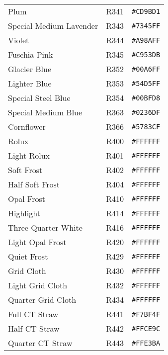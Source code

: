 \documentclass[a4paper]{article}
\begin{document}
\begin{longtable}{|l|l|r|}
Plum & R341 & \texttt{\#CD9BD1} \cellcolor[HTML]{CD9BD1} \\
Special Medium Lavender & R343 & \texttt{\#7345FF} \cellcolor[HTML]{7345FF} \\
Violet & R344 & \texttt{\#A98AFF} \cellcolor[HTML]{A98AFF} \\
Fuschia Pink & R345 & \texttt{\#C953DB} \cellcolor[HTML]{C953DB} \\
Glacier Blue & R352 & \texttt{\#00A6FF} \cellcolor[HTML]{00A6FF} \\
Lighter Blue & R353 & \texttt{\#54D5FF} \cellcolor[HTML]{54D5FF} \\
Special Steel Blue  & R354 & \texttt{\#00BFD8} \cellcolor[HTML]{00BFD8} \\
Special Medium Blue & R363 & \texttt{\#0236DF} \cellcolor[HTML]{0236DF} \\
Cornflower & R366 & \texttt{\#5783CF} \cellcolor[HTML]{5783CF} \\
Rolux & R400 & \texttt{\#FFFFFF} \cellcolor[HTML]{FFFFFF} \\
Light Rolux & R401 & \texttt{\#FFFFFF} \cellcolor[HTML]{FFFFFF} \\
Soft Frost & R402 & \texttt{\#FFFFFF} \cellcolor[HTML]{FFFFFF} \\
Half Soft Frost & R404 & \texttt{\#FFFFFF} \cellcolor[HTML]{FFFFFF} \\
Opal Frost & R410 & \texttt{\#FFFFFF} \cellcolor[HTML]{FFFFFF} \\
Highlight & R414 & \texttt{\#FFFFFF} \cellcolor[HTML]{FFFFFF} \\
Three Quarter White & R416 & \texttt{\#FFFFFF} \cellcolor[HTML]{FFFFFF} \\
Light Opal Frost & R420 & \texttt{\#FFFFFF} \cellcolor[HTML]{FFFFFF} \\
Quiet Frost & R429 & \texttt{\#FFFFFF} \cellcolor[HTML]{FFFFFF} \\
Grid Cloth & R430 & \texttt{\#FFFFFF} \cellcolor[HTML]{FFFFFF} \\
Light Grid Cloth & R432 & \texttt{\#FFFFFF} \cellcolor[HTML]{FFFFFF} \\
Quarter Grid Cloth & R434 & \texttt{\#FFFFFF} \cellcolor[HTML]{FFFFFF} \\
Full CT Straw & R441 & \texttt{\#F7BF4F} \cellcolor[HTML]{F7BF4F} \\
Half CT Straw & R442 & \texttt{\#FFCE9C} \cellcolor[HTML]{FFCE9C} \\
Quarter CT Straw & R443 & \texttt{\#FFE3BA} \cellcolor[HTML]{FFE3BA} \\

\end{longtable}
\end{document}

